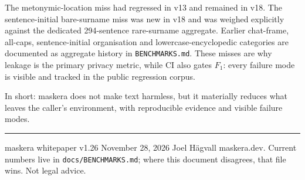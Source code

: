 \documentclass[10pt,a4paper]{article}
\newcommand{\pkg}[1]{\texttt{#1}}
\begin{document}
The metonymic-location miss had regressed in v13 and remained in v18. The
sentence-initial bare-surname miss was new in v18 and was weighed explicitly
against the dedicated 294-sentence rare-surname aggregate. Earlier chat-frame,
all-caps, sentence-initial organisation and lowercase-encyclopedic categories
are documented as aggregate history in \pkg{BENCHMARKS.md}. These misses
are why leakage is the primary privacy metric, while CI also gates $F_1$:
every failure mode is visible and tracked in the public regression corpus.

In short: maskera does not make text harmless, but it materially reduces
what leaves the caller's environment, with reproducible evidence and
visible failure modes.

\vfill
\noindent\rule{\textwidth}{0.4pt}\par\smallskip
{\footnotesize\raggedright maskera \textperiodcentered{} whitepaper v1.26
\textperiodcentered{} November 28, 2026 \textperiodcentered{} Joel H\"agvall
\textperiodcentered{} maskera.dev. Current numbers live in
\pkg{docs/BENCHMARKS.md}; where this document disagrees, that file wins.
Not legal advice.\par}
\end{document}
